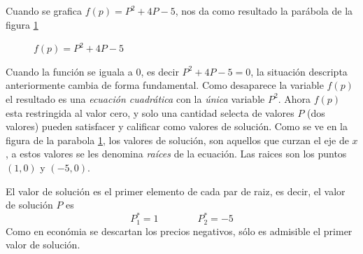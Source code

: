 Cuando se grafica \(f(p) = P^2 +4P - 5\), nos da como resultado la parábola de la figura \ref{Gráfica_cuadratica_modelo_no_lineal_1}

\begin{figure}[htbp]
    \centering
    \caption{\(f(p)=P^2+4P-5\)}
    \label{Gráfica_cuadratica_modelo_no_lineal_1}
\end{figure}

Cuando la función se iguala a \(0\), es decir \(P^2+4P -5 = 0\), la situación descripta anteriormente cambia de forma fundamental. Como desaparece la variable \(f(p)\) el resultado es una \textit{ecuación cuadrática} con la \textit{única} variable \(P^2\). Ahora \(f(p)\) esta restringida al valor cero, y solo una cantidad selecta de valores \(P\) (dos valores) pueden satisfacer y calificar como valores de solución. Como se ve en la figura de la parabola \ref{Gráfica_cuadratica_modelo_no_lineal_1}, los valores de solución, son aquellos que curzan el eje de \(x\), a estos valores se les denomina \textit{raíces} de la ecuación. Las raices son los puntos \((1,0)\) y \((-5,0)\). 

El valor de solución es el primer elemento de cada par de raiz, es decir, el valor de solución \(P\) es 
\[
P_1^\ast = 1 \qquad \qquad P_2^\ast = -5
\]
Como en económia se descartan los precios negativos, sólo es admisible el primer valor de solución.



